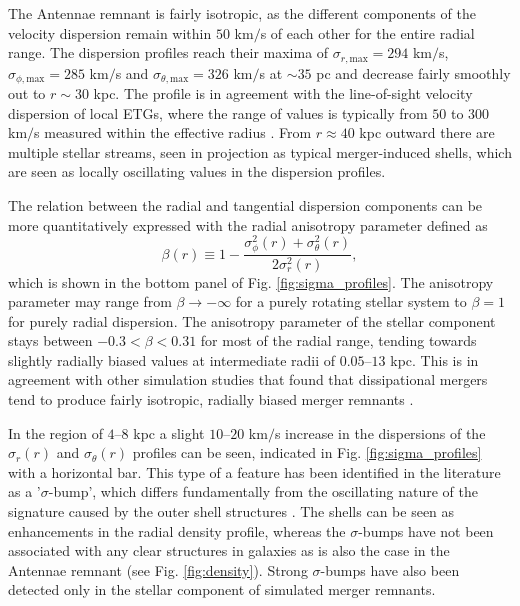 \documentclass[a4paper,fleqn,usenatbib]{mnras}
\begin{document}
The Antennae remnant is fairly isotropic, as the different components
of the velocity dispersion remain within $50$ km$/$s of each other for the entire radial range.
The dispersion profiles reach their maxima of $\sigma_{r,\mathrm{max}}=294$ km$/$s, 
$\sigma_{\phi,\mathrm{max}}=285$ km$/$s and $\sigma_{\theta,\mathrm{max}}=326$ km$/$s
at $\sim35$ pc and decrease fairly smoothly out to $r\sim30$ kpc. 
The profile is in agreement with the line-of-sight velocity dispersion of local ETGs, where the range of values is typically from $50$
to $300$ km$/$s measured within the effective radius \citep{2013MNRAS.432.1709C}.
From $r\approx40$ kpc outward there are
multiple stellar streams, seen in projection as typical merger-induced shells, 
which are seen as locally oscillating values in the dispersion profiles.

The relation between the radial and tangential dispersion components can be more quantitatively expressed with 
the radial anisotropy parameter defined as
\begin{equation}\label{eq:anisotropy}
 \beta (r) \equiv 1-\frac{\sigma_{\phi}^2(r)+\sigma_{\theta}^2(r)}{2\sigma_{r}^2(r)},
\end{equation}
which is shown in the bottom panel of Fig. \ref{fig:sigma_profiles}.
The anisotropy parameter may range from $\beta \to -\infty$ for a purely rotating 
stellar system to $\beta=1$ for purely radial dispersion. 
The anisotropy parameter of the stellar component stays between $-0.3<\beta<0.31$ for most of the
radial range, tending towards slightly radially biased values at intermediate radii of $0.05$--$13$ kpc.
This is in agreement with other simulation studies that found that dissipational mergers tend to produce 
fairly isotropic, radially biased merger remnants \citep{2006ApJ...650..791C}.

In the region of $4$--$8$ kpc a slight $10$--$20$ km$/$s increase in the dispersions of the $\sigma_r (r)$ and $\sigma_\theta (r)$ profiles
can be seen, indicated in Fig. \ref{fig:sigma_profiles} with a horizontal bar. This type of a feature has been identified in the literature
as a '$\sigma$-bump', which differs fundamentally from the oscillating nature of the signature
caused by the outer shell structures \citep{2014ApJ...783L..32S}. The shells can be
seen as enhancements in the radial density profile, whereas the $\sigma$-bumps have not been associated
with any clear structures in galaxies as is also the case in the Antennae remnant (see Fig. \ref{fig:density}).
Strong $\sigma$-bumps have also been detected only in the stellar component of simulated merger remnants. 
 
\end{document}
